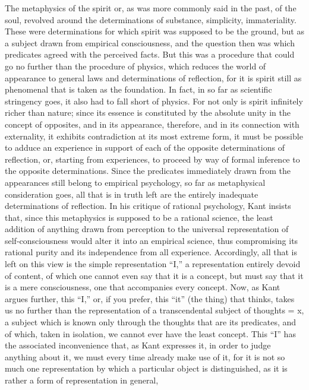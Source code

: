 The metaphysics of the spirit or,
as was more commonly said in the past, of the soul,
revolved around the determinations
of substance, simplicity, immateriality.
These were determinations for which
spirit was supposed to be the ground,
but as a subject drawn from empirical consciousness,
and the question then was which predicates
agreed with the perceived facts.
But this was a procedure that could go
no further than the procedure of physics,
which reduces the world of appearance
to general laws and determinations of reflection,
for it is spirit still as phenomenal
that is taken as the foundation.
In fact, in so far as scientific stringency goes,
it also had to fall short of physics.
For not only is spirit infinitely richer than nature;
since its essence is constituted by
the absolute unity in the concept of opposites,
and in its appearance, therefore,
and in its connection with externality,
it exhibits contradiction at its most extreme form,
it must be possible to adduce an experience in support of
each of the opposite determinations of reflection,
or, starting from experiences, to proceed by way
of formal inference to the opposite determinations.
Since the predicates immediately drawn from
the appearances still belong to empirical psychology,
so far as metaphysical consideration goes,
all that is in truth left are
the entirely inadequate determinations of reflection.
In his critique of rational psychology, Kant insists that,
since this metaphysics is supposed to be a rational science,
the least addition of anything drawn from perception
to the universal representation of self-consciousness
would alter it into an empirical science,
thus compromising its rational purity
and its independence from all experience.
Accordingly, all that is left on this view is
the simple representation “I,”
a representation entirely devoid of content,
of which one cannot even say that it is a concept,
but must say that it is a mere consciousness,
one that accompanies every concept.
Now, as Kant argues further, this “I,”
or, if you prefer, this “it” (the thing) that thinks,
takes us no further than the representation
of a transcendental subject of thoughts = x,
a subject which is known only through
the thoughts that are its predicates,
and of which, taken in isolation,
we cannot ever have the least concept.
This “I” has the associated inconvenience that,
as Kant expresses it, in order to judge anything about it,
we must every time already make use of it,
for it is not so much one representation
by which a particular object is distinguished,
as it is rather a form of representation in general,
